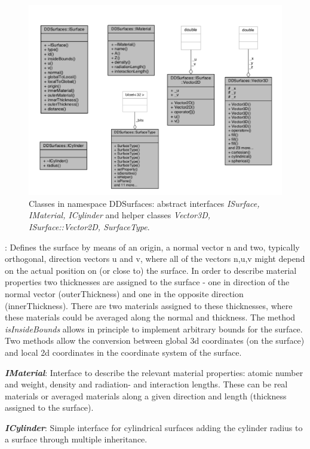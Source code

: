 \documentclass[10pt,a4paper]{article}
\begin{document}
\begin{figure}[h]
  \begin{center}
    \includegraphics[width=120mm] {DDRec_ISurface_classes}
    \caption{Classes in namespace DDSurfaces: abstract interfaces {\em ISurface, IMaterial, ICylinder}
      and helper classes {\em Vector3D, ISurface::Vector2D, SurfaceType}. }
    \label{fig:ddrec_ddsurfaces_classes}
  \end{center}
\end{figure}

: Defines the surface by means of an origin, a normal vector n and two, 
typically orthogonal, direction vectors u and v, where all of the vectors n,u,v might depend 
on the actual position on (or close to) the surface. In order to describe material properties
two thicknesses are assigned to the surface - one in direction of the normal vector (outerThickness) 
and one in the opposite direction (innerThickness). There are two materials assigned to these
thicknesses, where these materials could be averaged along the normal and thickness.
The method {\em isInsideBounds} allows in principle to implement arbitrary bounds for the surface.
Two methods allow the conversion between global 3d coordinates (on the surface) and local 2d coordinates 
in the coordinate system of the surface.
 
\noindent
{\em \bf IMaterial}: Interface to describe the relevant material properties: atomic number and weight, 
density and radiation- and interaction lengths. These can be real materials or averaged materials along
a given direction and length (thickness assigned to the surface).

\noindent
{\em \bf ICylinder}: Simple interface for cylindrical surfaces adding the cylinder radius to a surface
through multiple inheritance.
\end{document}

